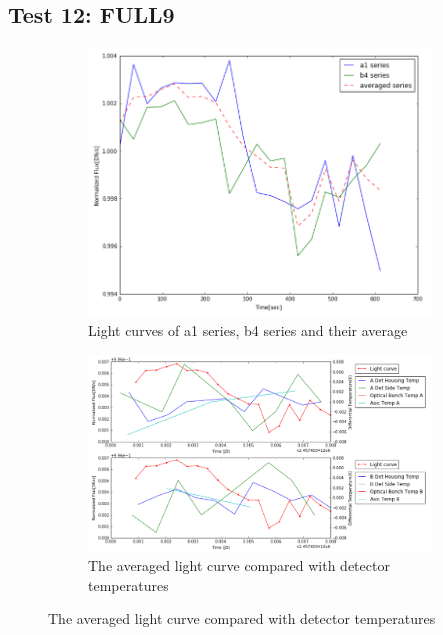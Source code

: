\documentclass{aastex6}
\begin{document}
\subsection{Test 12: FULL9} 
\begin{figure}[H]
    \centering
    \begin{subfigure}{1}
        \includegraphics[scale=0.4]{ts_test12}
        \caption{Light curves of a1 series, b4 series and their average}
    \end{subfigure}

    \begin{subfigure}{2}
        \includegraphics[scale=0.4]{temp_test12}
        \caption{The averaged light curve compared with detector temperatures}
    \end{subfigure}
   

\end{figure}
\end{document}
